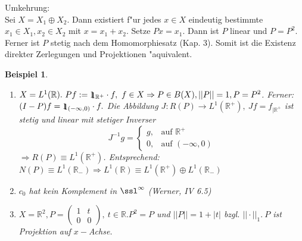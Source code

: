 \documentclass[a4paper,11pt]{book}
\newcommand{\R}{{\mathbb R}}
\newcommand{\id}{1\hspace{-0,9ex}\raisebox{-0,2ex}{1}}
\newtheorem{Bsp}[Def]{Beispiel}
\theoremstyle{nonumberplain}
\begin{document}
Umkehrung:\\
Sei $X = X_1 \oplus X_2$. Dann existiert f"ur jedes $x \in X$ eindeutig bestimmte $x_1 \in X_1, x_2 \in X_2$ mit $x = x_1 + x_2$. Setze $Px = x_1$. Dann ist $P$ linear und $P=P^2$. Ferner ist $P$ stetig nach dem Homomorphiesatz (Kap. 3). Somit ist die Existenz direkter Zerlegungen und Projektionen "aquivalent.

\begin{Bsp}
\begin{enumerate}

\item[a)] $X = L^1(\R).\ Pf := \id_{\R^+} \cdot f,\ f \in X \Rightarrow P \in B(X), ||P|| = 1, P = P^2$. Ferner: $(I-P)f = \id_{(-\infty,0)} \cdot f.$ Die Abbildung $J: R(P) \rightarrow L^1(\R^+),\ Jf = f_{|\R^+}$ ist stetig und linear mit stetiger Inverser
\[
J^{-1}g = \left\{
\begin{array}{cl}
g ,& \text{auf } \R^+ \\
0 ,& \text{auf } (-\infty,0)
\end{array} \right.
\]
$\Rightarrow R(P) \equiv L^1(\R^+)$. Entsprechend: $N(P) \equiv L^1(\R_-) \Rightarrow L^1(\R) \equiv L^1(\R^+) \oplus L^1(\R_-)$

\item[b)] $c_0$ hat kein Komplement in $\ssl^{\infty}$ (Werner, IV 6.5)

\item[c)] $X = \R^2, P = \begin{pmatrix} 1 & t \\ 0 & 0 \end{pmatrix},\ t \in \R. P^2 = P$ und $||P|| = 1 + |t|$ bzgl. $||\cdot||_1.\ P$ ist Projektion auf $x-$Achse.
\end{enumerate}
\end{Bsp}
\end{document}
